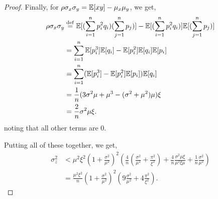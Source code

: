 \begin{proof}
  Finally, for $\rho \sigma_x \sigma_y = \mathbb{E}[x y] - \mu_x \mu_y$, we get,
  \begin{align*}
      \rho \sigma_x \sigma_y &\stackrel{\rm def}{=} \mathbb{E}[(\sum_{i=1}^n p^2_i q_i)(\sum_{j=1}^n p_j)] -  \mathbb{E}[(\sum_{i=1}^n p^2_i q_i)]\mathbb{E}[(\sum_{j=1}^n p_j)]\\
           &= \sum_{i=1}^n \mathbb{E}[p^3_i] \mathbb{E}[q_i] - \mathbb{E}[p^2_i] \mathbb{E}[q_i] \mathbb{E}[p_i] \\
           &= \sum_{i=1}^n (\mathbb{E}[p^3_i] - \mathbb{E}[p^2_i] \mathbb{E}[p_i]) \mathbb{E}[q_i] \\
           &= \frac{1}{n} (3\sigma^2 \mu + \mu^3 - (\sigma^2 + \mu^2) \mu) \xi \\
           &= \frac{2}{n} \sigma^2 \mu \xi.
  \end{align*}
  noting that all other terms are 0.

  Putting all of these together, we get,
  \begin{align*}
    \sigma_z^2 &< 
           \mu^2 \xi^2 (1 + \frac{\sigma^2}{\mu^2})^2
           \left(
           \frac{4}{n} (\frac{\sigma^2}{\mu^2} + \frac{\pi^2}{\xi^2})
              +
              \frac{4}{n} \frac{\sigma^2 \mu \xi}{\mu^2 \xi \mu}
              +
              \frac{1}{n} \frac{\sigma^2}{\mu^2}
              \right) \\
           &=
           \frac{\mu^2 \xi^2}{n} \left( 1 + \frac{\sigma^2}{\mu^2} \right)^2
             \left(
                9 \frac{\sigma^2}{\mu^2} + 4 \frac{\pi^2}{\xi^2}
                \right).
  \end{align*}



\end{proof}

